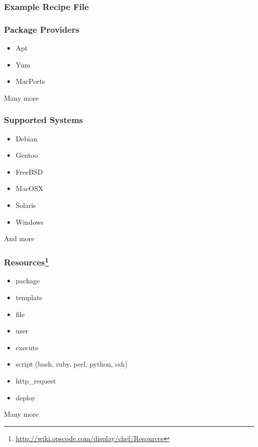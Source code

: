 \documentclass[16pt]{beamer}
\begin{document}
\begin{frame}
  \frametitle{Example Recipe File}
  \begin{footnotesize}
    
    \label{postgres_server_recipe}
    \end{footnotesize}
\end{frame}

\begin{frame}
  \frametitle{Package Providers}
  \begin{itemize}
    \item Apt
    \item Yum
    \item MacPorts
  \end{itemize}
  \pause
  \begin{center}
    \large Many more
  \end{center}
\end{frame}

\begin{frame}
  \frametitle{Supported Systems}
  \begin{itemize}
    \item Debian
    \item Gentoo
    \item FreeBSD
    \item MacOSX
    \item Solaris
    \pause
    \item Windows
  \end{itemize}
  \pause
  \begin{center}
    \large And more
  \end{center}
\end{frame}

\begin{frame}
  \frametitle{Resources\footnote{\url{http://wiki.opscode.com/display/chef/Resources}}}
  \begin{itemize}
    \item package
    \item template
    \item file
    \item user
    \item execute
    \item script (bash, ruby, perl, python, csh)
    \item http\_request
    \item deploy
  \end{itemize}
  \pause
  \begin{center}
    \large Many more
  \end{center}
\end{frame}
\end{document}
